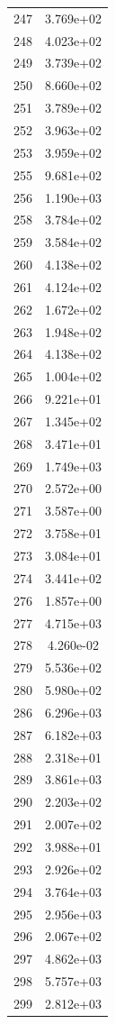 \documentclass[12pt]{article}
\begin{document}
\begin{longtable}{@{}cc@{}}
247 & 3.769e+02 \\
248 & 4.023e+02 \\
249 & 3.739e+02 \\
250 & 8.660e+02 \\
251 & 3.789e+02 \\
252 & 3.963e+02 \\
253 & 3.959e+02 \\
255 & 9.681e+02 \\
256 & 1.190e+03 \\
258 & 3.784e+02 \\
259 & 3.584e+02 \\
260 & 4.138e+02 \\
261 & 4.124e+02 \\
262 & 1.672e+02 \\
263 & 1.948e+02 \\
264 & 4.138e+02 \\
265 & 1.004e+02 \\
266 & 9.221e+01 \\
267 & 1.345e+02 \\
268 & 3.471e+01 \\
269 & 1.749e+03 \\
270 & 2.572e+00 \\
271 & 3.587e+00 \\
272 & 3.758e+01 \\
273 & 3.084e+01 \\
274 & 3.441e+02 \\
276 & 1.857e+00 \\
277 & 4.715e+03 \\
278 & 4.260e-02 \\
279 & 5.536e+02 \\
280 & 5.980e+02 \\
286 & 6.296e+03 \\
287 & 6.182e+03 \\
288 & 2.318e+01 \\
289 & 3.861e+03 \\
290 & 2.203e+02 \\
291 & 2.007e+02 \\
292 & 3.988e+01 \\
293 & 2.926e+02 \\
294 & 3.764e+03 \\
295 & 2.956e+03 \\
296 & 2.067e+02 \\
297 & 4.862e+03 \\
298 & 5.757e+03 \\
299 & 2.812e+03 \\

\end{longtable}
\end{document}
